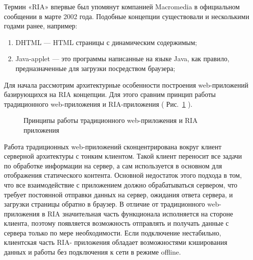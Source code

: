 Термин «RIA» впервые был упомянут компанией Macromedia в официальном сообщении в
марте 2002 года. Подобные концепции существовали и несколькими годами ранее, например:

\begin{enumerate}
\item DHTML --- HTML страницы с динамическим содержимым;
\item Java-applet --- это программы написанные на языке Java, как правило, предназначенные для загрузки посредством
браузера;
\end{enumerate}

Для начала рассмотрим архитектурные особенности построения web-приложений базирующихся 
на RIA концепции. Для этого сравним принцип работы традиционного web-приложения и
RIA-приложения ( Рис.~\ref{ris:principlesRIA.png} ).
\begin{figure}[h]
\caption{Принципы работы традиционного web-приложения и RIA приложения}
\label{ris:principlesRIA.png}
\end{figure}

Работа традиционных web-приложений сконцентрирована вокруг клиент серверной архитектуры 
с тонким клиентом. Такой клиент переносит все задачи по обработке информации на сервер,
а сам используется в основном для отображения статического контента. Основной
недостаток этого подхода в том, что все взаимодействие с приложением должно
обрабатываться сервером, что требует постоянной отправки данных на сервер,
ожидания ответа сервера, и загрузки страницы обратно в браузер. В отличие от 
традиционного web-приложения в RIA значительная часть функционала исполняется на
стороне клиента, поэтому появляется возможность отправлять и получать данные с сервера
только по мере необходимости. Если подключение нестабильно, клиентская часть RIA-
приложения обладает возможностями кэширования данных и работы без подключения к сети в 
режиме offline.

